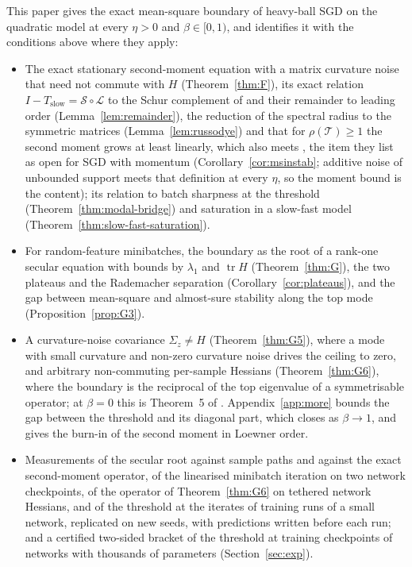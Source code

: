 \documentclass[11pt]{article}
\theoremstyle{remark}
\newcommand{\tr}{\operatorname{tr}}
\begin{document}
This paper gives the exact mean-square boundary of heavy-ball SGD on the quadratic model at every $\eta>0$ and $\beta\in[0,1)$, and identifies it with the conditions above where they apply:
\begin{itemize}
\item The exact stationary second-moment equation with a matrix curvature noise that need not commute with $H$ (Theorem~\ref{thm:F}), its exact relation $I-T_{\mathrm{slow}}=\mathcal S\circ\mathcal L$ to the Schur complement of \citet[Appendix~D]{andreyev2026momentum} and their remainder to leading order (Lemma~\ref{lem:remainder}), the reduction of the spectral radius to the symmetric matrices (Lemma~\ref{lem:russodye}) and that for $\rho(\mathcal T)\ge1$ the second moment grows at least linearly, which also meets \citet[Definition~A.1]{andreyev2026momentum}, the item they list as open for SGD with momentum (Corollary~\ref{cor:msinstab}; additive noise of unbounded support meets that definition at every $\eta$, so the moment bound is the content); its relation to batch sharpness at the threshold (Theorem~\ref{thm:modal-bridge}) and saturation in a slow-fast model (Theorem~\ref{thm:slow-fast-saturation}).
\item For random-feature minibatches, the boundary as the root of a rank-one secular equation with bounds by $\lambda_1$ and $\tr H$ (Theorem~\ref{thm:G}), the two plateaus and the Rademacher separation (Corollary~\ref{cor:plateaus}), and the gap between mean-square and almost-sure stability along the top mode (Proposition~\ref{prop:G3}).
\item A curvature-noise covariance $\Sigma_z\ne H$ (Theorem~\ref{thm:G5}), where a mode with small curvature and non-zero curvature noise drives the ceiling to zero, and arbitrary non-commuting per-sample Hessians (Theorem~\ref{thm:G6}), where the boundary is the reciprocal of the top eigenvalue of a symmetrisable operator; at $\beta=0$ this is Theorem~5 of \citet{mulayoff2024exact}. Appendix~\ref{app:more} bounds the gap between the threshold and its diagonal part, which closes as $\beta\to1$, and gives the burn-in of the second moment in Loewner order.
\item Measurements of the secular root against sample paths and against the exact second-moment operator, of the linearised minibatch iteration on two network checkpoints, of the operator of Theorem~\ref{thm:G6} on tethered network Hessians, and of the threshold at the iterates of training runs of a small network, replicated on new seeds, with predictions written before each run; and a certified two-sided bracket of the threshold at training checkpoints of networks with thousands of parameters (Section~\ref{sec:exp}).
\end{itemize}
\end{document}
